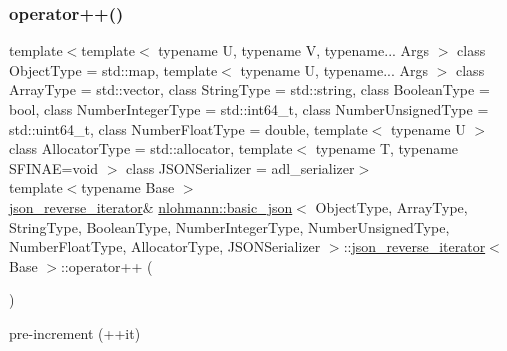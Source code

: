 \subsubsection{\texorpdfstring{operator++()}{operator++()}\hspace{0.1cm}{\footnotesize\ttfamily [2/2]}}
{\footnotesize\ttfamily template$<$template$<$ typename U, typename V, typename... Args $>$ class Object\+Type = std\+::map, template$<$ typename U, typename... Args $>$ class Array\+Type = std\+::vector, class String\+Type  = std\+::string, class Boolean\+Type  = bool, class Number\+Integer\+Type  = std\+::int64\+\_\+t, class Number\+Unsigned\+Type  = std\+::uint64\+\_\+t, class Number\+Float\+Type  = double, template$<$ typename U $>$ class Allocator\+Type = std\+::allocator, template$<$ typename T, typename S\+F\+I\+N\+A\+E=void $>$ class J\+S\+O\+N\+Serializer = adl\+\_\+serializer$>$ \\
template$<$typename Base $>$ \\
\hyperlink{classnlohmann_1_1basic__json_1_1json__reverse__iterator}{json\+\_\+reverse\+\_\+iterator}\& \hyperlink{classnlohmann_1_1basic__json}{nlohmann\+::basic\+\_\+json}$<$ Object\+Type, Array\+Type, String\+Type, Boolean\+Type, Number\+Integer\+Type, Number\+Unsigned\+Type, Number\+Float\+Type, Allocator\+Type, J\+S\+O\+N\+Serializer $>$\+::\hyperlink{classnlohmann_1_1basic__json_1_1json__reverse__iterator}{json\+\_\+reverse\+\_\+iterator}$<$ Base $>$\+::operator++ (\begin{DoxyParamCaption}{ }\end{DoxyParamCaption})\hspace{0.3cm}{\ttfamily [inline]}}



pre-\/increment (++it) 

\mbox{\label{classnlohmann_1_1basic__json_1_1json__reverse__iterator_a3b884d9fc5de7013be144b304df9c068}} 
